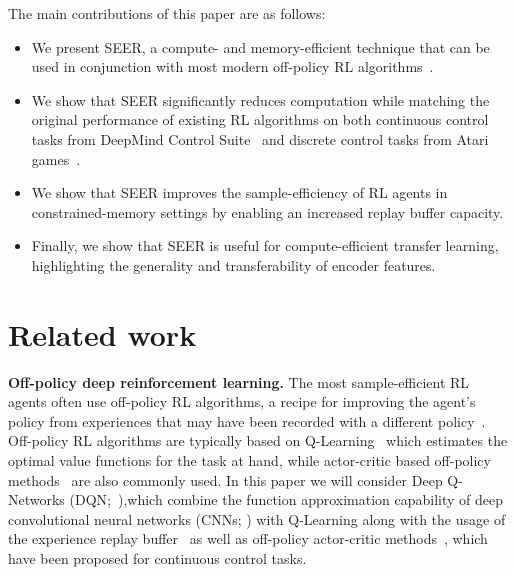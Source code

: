 \documentclass{article}
\begin{document}
The main contributions of this paper are as follows:
\begin{itemize} [leftmargin=5.5mm]
    \item We present SEER, a compute- and memory-efficient technique that can be used in conjunction with most modern off-policy RL algorithms~\citep{haarnoja2018soft,hessel2018rainbow}.
    \item We show that SEER significantly reduces computation while matching the original performance of existing RL algorithms on both continuous control tasks from DeepMind Control Suite~\citep{tassa2018deepmind} and discrete control tasks from Atari games~\citep{bellemare2013arcade}.
    \item We show that SEER improves the sample-efficiency of RL agents in constrained-memory settings by enabling an increased replay buffer capacity.
    \item Finally, we show that SEER is useful for compute-efficient transfer learning, highlighting the generality and transferability of encoder features.
\end{itemize}

















\section{Related work} \label{sec:ref}

{\bf Off-policy deep reinforcement learning.} The most sample-efficient RL agents often use off-policy RL algorithms, a recipe for improving the agent's policy from experiences that may have been recorded with a different policy~\citep{sutton2018reinforcement}. Off-policy RL algorithms are typically based on Q-Learning~\citep{watkins1992q} which estimates the optimal value functions for the task at hand, while actor-critic based off-policy methods~\citep{lillicrap2015continuous, schulman2017equivalence, haarnoja2018soft} are also commonly used. 
In this paper we will consider Deep Q-Networks (DQN;~\citealt{mnih2015human}),which combine the function approximation capability of deep convolutional neural networks (CNNs; \citealt{lecun1998gradient}) with Q-Learning along with the usage of the experience replay buffer~\citep{lin1992self} as well as off-policy actor-critic methods~\citep{lillicrap2015continuous,haarnoja2018soft}, which have been proposed for continuous control tasks.
\end{document}
